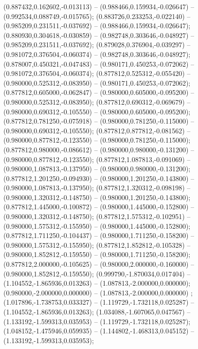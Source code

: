  (0.887432,0.162602,-0.013113) -- (0.988466,0.159934,-0.026647) -- (0.992534,0.088749,-0.015765);
 (0.883726,0.233253,-0.022140) -- (0.985209,0.231511,-0.037692) -- (0.988466,0.159934,-0.026647);
 (0.880930,0.304618,-0.030859) -- (0.982748,0.303646,-0.048927) -- (0.985209,0.231511,-0.037692);
 (0.879028,0.376904,-0.039297) -- (0.981072,0.376504,-0.060374) -- (0.982748,0.303646,-0.048927);
 (0.878007,0.450321,-0.047483) -- (0.980171,0.450253,-0.072062) -- (0.981072,0.376504,-0.060374);
 (0.877812,0.525312,-0.055420) -- (0.980000,0.525312,-0.083950) -- (0.980171,0.450253,-0.072062);
 (0.877812,0.605000,-0.062847) -- (0.980000,0.605000,-0.095200) -- (0.980000,0.525312,-0.083950);
 (0.877812,0.690312,-0.069679) -- (0.980000,0.690312,-0.105550) -- (0.980000,0.605000,-0.095200);
 (0.877812,0.781250,-0.075918) -- (0.980000,0.781250,-0.115000) -- (0.980000,0.690312,-0.105550);
 (0.877812,0.877812,-0.081562) -- (0.980000,0.877812,-0.123550) -- (0.980000,0.781250,-0.115000);
 (0.877812,0.980000,-0.086612) -- (0.980000,0.980000,-0.131200) -- (0.980000,0.877812,-0.123550);
 (0.877812,1.087813,-0.091069) -- (0.980000,1.087813,-0.137950) -- (0.980000,0.980000,-0.131200);
 (0.877812,1.201250,-0.094930) -- (0.980000,1.201250,-0.143800) -- (0.980000,1.087813,-0.137950);
 (0.877812,1.320312,-0.098198) -- (0.980000,1.320312,-0.148750) -- (0.980000,1.201250,-0.143800);
 (0.877812,1.445000,-0.100872) -- (0.980000,1.445000,-0.152800) -- (0.980000,1.320312,-0.148750);
 (0.877812,1.575312,-0.102951) -- (0.980000,1.575312,-0.155950) -- (0.980000,1.445000,-0.152800);
 (0.877812,1.711250,-0.104437) -- (0.980000,1.711250,-0.158200) -- (0.980000,1.575312,-0.155950);
 (0.877812,1.852812,-0.105328) -- (0.980000,1.852812,-0.159550) -- (0.980000,1.711250,-0.158200);
 (0.877812,2.000000,-0.105625) -- (0.980000,2.000000,-0.160000) -- (0.980000,1.852812,-0.159550);
 (0.999790,-1.870034,0.017404) -- (1.104552,-1.865936,0.013263) -- (1.087813,-2.000000,0.000000);
 (0.980000,-2.000000,0.000000) -- (1.087813,-2.000000,0.000000) ;
 (1.017896,-1.738753,0.033327) -- (1.119729,-1.732118,0.025287) -- (1.104552,-1.865936,0.013263);
 (1.034088,-1.607065,0.047567) -- (1.133192,-1.599313,0.035953) -- (1.119729,-1.732118,0.025287);
 (1.048152,-1.475946,0.059935) -- (1.144802,-1.468313,0.045152) -- (1.133192,-1.599313,0.035953);

